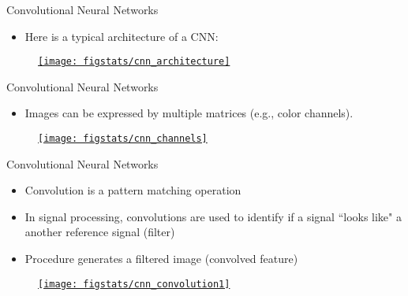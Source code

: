 \documentclass[handout,9pt]{beamer}
\begin{document}
\begin{frame}{Convolutional Neural Networks}

\begin{itemize}
\item Here is a typical architecture of a CNN:
\end{itemize}

\begin{figure}[!htb]
    \centering
	\href{https://towardsdatascience.com/a-comprehensive-guide-to-convolutional-neural-networks-the-eli5-way-3bd2b1164a53}{\texttt{[image: figstats/cnn\_architecture]}}
\end{figure}

\end{frame}

\begin{frame}{Convolutional Neural Networks}

\begin{itemize}
\item Images can be expressed by multiple matrices (e.g., color channels).
\end{itemize}

\begin{figure}[!htb]
    \centering
		\href{https://towardsdatascience.com/a-comprehensive-guide-to-convolutional-neural-networks-the-eli5-way-3bd2b1164a53}{\texttt{[image: figstats/cnn\_channels]}}
\end{figure}

\end{frame}

\begin{frame}{Convolutional Neural Networks}

\begin{itemize}
   \setlength{\itemsep}{10pt}
\item Convolution is a pattern matching operation 
\item In signal processing, convolutions are used to identify if a signal ``looks like" a another reference signal (filter)
\item Procedure generates a filtered image (convolved feature)
\end{itemize}


\begin{figure}[!htb]
    \centering
		\href{https://towardsdatascience.com/a-comprehensive-guide-to-convolutional-neural-networks-the-eli5-way-3bd2b1164a53}{\texttt{[image: figstats/cnn\_convolution1]}}
\end{figure}

\end{frame}
\end{document}
